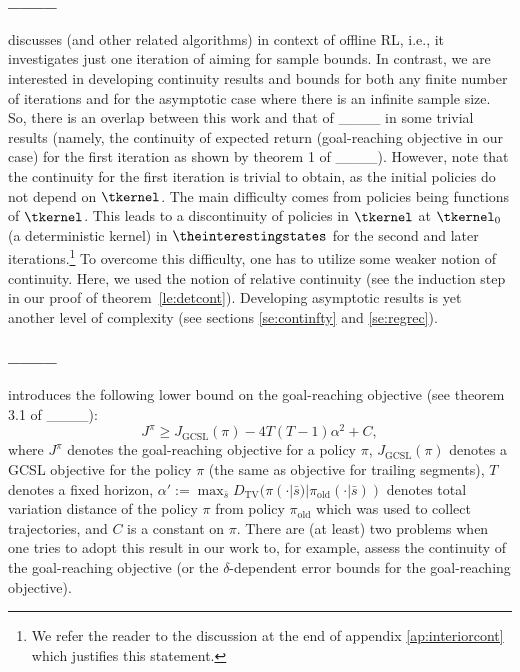 \paragraph{____}
discusses \eUDRL{} (and other related algorithms)
in context of offline RL, i.e.,
it investigates just one iteration of \eUDRL{} aiming for
sample bounds. In contrast, we are interested in developing continuity results and bounds for both any finite number of iterations and for the asymptotic case where there is an infinite sample size.
So, there is an overlap between this work and that of ____ in some trivial results (namely, the continuity of expected return (goal-reaching objective in our case) for the first iteration as shown by theorem 1 of ____). However, note that the continuity for the
first iteration is trivial to obtain, as the initial policies do not depend on $\tkernel$. The main difficulty
comes from policies being functions of $\tkernel$. This leads to a
discontinuity of policies in $\tkernel$
at $\tkernel_0$ (a deterministic kernel) in $\theinterestingstates$ for the second and later iterations.\footnote{We refer the reader to the discussion at the end of appendix \ref{ap:interiorcont} which justifies this statement.} To overcome this difficulty, one has to utilize some weaker notion of continuity.
Here, we used the notion of relative continuity (see the induction step
in our proof of theorem~\ref{le:detcont}).
Developing asymptotic results is yet another level of complexity (see sections \ref{se:continfty}
and \ref{se:regrec}).

\paragraph{____}
introduces the following lower bound on the goal-reaching objective (see theorem 3.1 of ____):
$$
J^{\pi} \geq J_{\mathrm{GCSL}}(\pi) - 4T(T-1)\alpha^2 + C,
$$
where $J^{\pi}$ denotes the goal-reaching objective
for a policy $\pi$, $J_{\mathrm{GCSL}}(\pi)$
denotes a GCSL objective for the policy $\pi$
(the same as \eUDRL{} objective  for trailing segments), $T$ denotes a fixed horizon, $\alpha' := \max_{\bar{s}} D_{\mathrm{TV}}(\pi(\cdot|\bar{s})|\pi_{\mathrm{old}}(\cdot|\bar{s}))$
denotes total variation distance of the policy $\pi$ from
policy $\pi_{\mathrm{old}}$ which was used to collect trajectories, and $C$ is a constant on $\pi$. There are (at least) two problems when
one tries to adopt this result in our work to, for example, assess the continuity of the goal-reaching objective (or the $\delta$-dependent error bounds for the goal-reaching objective).

